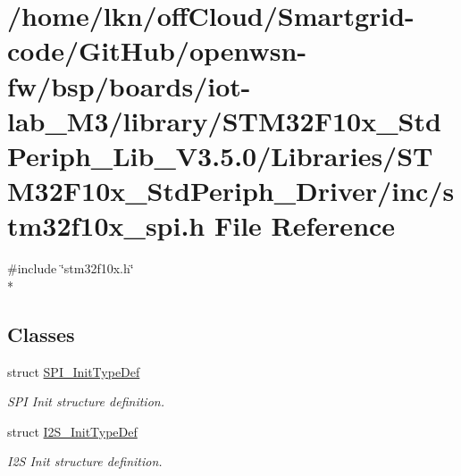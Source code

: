 \hypertarget{iot-lab___m3_2library_2_s_t_m32_f10x___std_periph___lib___v3_85_80_2_libraries_2_s_t_m32_f10x___ce79e3e237b56b6e7a17b6a582f353d5}{}\section{/home/lkn/off\+Cloud/\+Smartgrid-\/code/\+Git\+Hub/openwsn-\/fw/bsp/boards/iot-\/lab\+\_\+\+M3/library/\+S\+T\+M32\+F10x\+\_\+\+Std\+Periph\+\_\+\+Lib\+\_\+\+V3.5.0/\+Libraries/\+S\+T\+M32\+F10x\+\_\+\+Std\+Periph\+\_\+\+Driver/inc/stm32f10x\+\_\+spi.h File Reference}
\label{iot-lab___m3_2library_2_s_t_m32_f10x___std_periph___lib___v3_85_80_2_libraries_2_s_t_m32_f10x___ce79e3e237b56b6e7a17b6a582f353d5}
{\ttfamily \#include \char`\"{}stm32f10x.\+h\char`\"{}}\\*
\subsection*{Classes}
\begin{DoxyCompactItemize}
\item 
struct \hyperlink{struct_s_p_i___init_type_def}{S\+P\+I\+\_\+\+Init\+Type\+Def}
\begin{DoxyCompactList}\small\item\em S\+PI Init structure definition. \end{DoxyCompactList}\item 
struct \hyperlink{struct_i2_s___init_type_def}{I2\+S\+\_\+\+Init\+Type\+Def}
\begin{DoxyCompactList}\small\item\em I2S Init structure definition. \end{DoxyCompactList}\end{DoxyCompactItemize}
